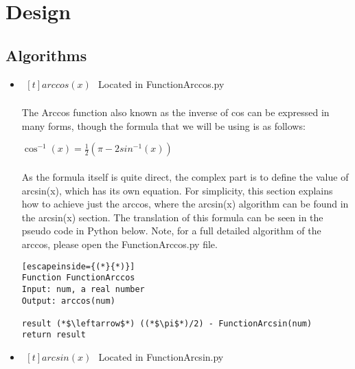 \section{Design}
    \subsection{Algorithms}
        \begin{itemize}
            \item $\begin{aligned}[t]
                arccos(x)
            \end{aligned}$
                Located in FunctionArccos.py
                \paragraph{}
                The Arccos function also known as the inverse of cos can be expressed in many forms, though the formula that we will be using is as follows:

                \begin{center}
                    $\cos^{-1}(x) = \frac{1}{2}(\pi - 2sin^{-1}(x))$
                \end{center}

                \paragraph{}
                As the formula itself is quite direct, the complex part is to define the value of arcsin(x), which has its own equation. For simplicity, this section explains how to achieve just the arccos, where the arcsin(x) algorithm can be found in the arcsin(x) section. The translation of this formula can be seen in the pseudo code in Python below. Note, for a full detailed algorithm of the arccos, please open the FunctionArccos.py file.

                \begin{lstlisting}[escapeinside={(*}{*)}]
Function FunctionArccos
Input: num, a real number
Output: arccos(num)

result (*$\leftarrow$*) ((*$\pi$*)/2) - FunctionArcsin(num)
return result
                \end{lstlisting}

        \item $\begin{aligned}[t]
            arcsin(x)
        \end{aligned}$
            Located in FunctionArcsin.py


\end{itemize}
